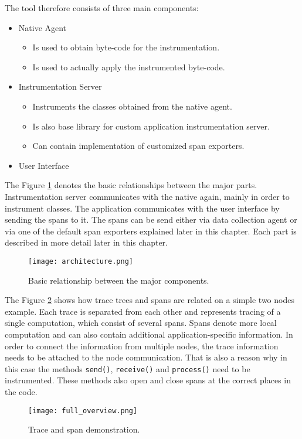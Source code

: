 The tool therefore consists of three main components:
\begin{itemize}
	\item Native Agent
	\begin{itemize}
		\item Is used to obtain byte-code for the instrumentation.
		\item Is used to actually apply the instrumented byte-code.
	\end{itemize}
	\item Instrumentation Server
	\begin{itemize}
		\item Instruments the classes obtained from the native agent.
		\item Is also base library for custom application instrumentation server.
		\item Can contain implementation of customized span exporters.
	\end{itemize}
	\item User Interface
\end{itemize}


The Figure \ref{fig:architecture} denotes the basic relationships between the major parts. Instrumentation server communicates with the native again, mainly in order to instrument classes. The application communicates with the user interface by sending the spans to it. The spans can be send either via data collection agent or via one of the default span exporters explained later in this chapter. Each part is described in more detail later in this chapter. \begin{figure}
	\centering
	\texttt{[image: architecture.png]}
	\caption{Basic relationship between the major components. }
	\label{fig:architecture}
\end{figure}

The Figure \ref{fig:full_overview} shows how trace trees and spans are related on a simple two nodes example. Each trace is separated from each other and represents tracing of a single computation, which consist of several spans. Spans denote more local computation and can also contain additional application-specific information. In order to connect the information from multiple nodes, the trace information needs to be attached to the node communication. That is also a reason why in this case the methods \texttt{send()}, \texttt{receive()} and \texttt{process()} need to be instrumented. These methods also open and close spans at the correct places in the code.
\begin{figure}
	\centering
	\texttt{[image: full\_overview.png]}
	\caption{Trace and span demonstration. }
	\label{fig:full_overview}
\end{figure}
